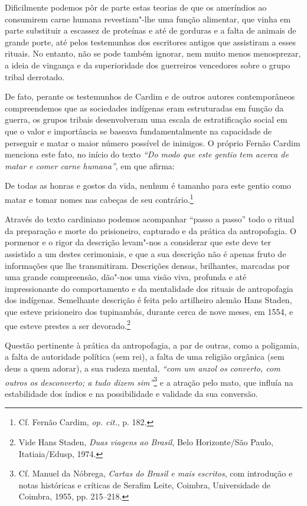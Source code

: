 Dificilmente podemos pôr de parte estas teorias de que os ameríndios
ao consumirem carne humana revestiam"-lhe uma função alimentar, que
vinha em parte substituir a escassez de proteínas e até de gorduras e a
falta de animais de grande porte, até pelos testemunhos dos escritores
antigos que assistiram a esses rituais. No entanto, não se pode também
ignorar, nem muito menos menosprezar, a ideia de vingança e da
superioridade dos guerreiros vencedores sobre o grupo tribal derrotado.

De fato, perante os testemunhos de Cardim e de outros autores
contemporâneos compreendemos que as sociedades indígenas eram
estruturadas em função da guerra, os grupos tribais desenvolveram uma
escala de estratificação social em que o valor e importância se baseava
fundamentalmente na capacidade de perseguir e matar o maior número
possível de inimigos. O próprio Fernão Cardim menciona este fato, no
início do texto \textit{``Do modo que este gentio tem
acerca de matar e comer carne humana''}, em que afirma:

\begin{hedraquote}
De todas as honras e gostos da vida, nenhum é tamanho para este gentio
como matar e tomar nomes nas cabeças de seu contrário.\footnote{ Cf. Fernão 
Cardim, \textit{op. cit.}, p. 182.} 
\end{hedraquote}

Através do texto cardiniano podemos acompanhar ``passo a passo'' todo
o ritual da preparação e morte do prisioneiro, capturado e da prática
da antropofagia. O pormenor e o rigor da descrição levam"-nos a
considerar que este deve ter assistido a um destes cerimoniais, e que a
sua descrição não é apenas fruto de informações que lhe transmitiram.
Descrições densas, brilhantes, marcadas por uma grande compreensão,
dão"-nos uma visão viva, profunda e até impressionante do comportamento
e da mentalidade dos rituais de antropofagia dos indígenas. Semelhante
descrição é feita pelo artilheiro alemão Hans Staden, que esteve
prisioneiro dos tupinambás, durante cerca de nove meses, em 1554, e que
esteve prestes a ser devorado.\footnote{ Vide Hans Staden,
\textit{Duas viagens ao Brasil}, Belo Horizonte/São Paulo, Itatiaia/Edusp, 1974.} 

Questão pertinente à prática da antropofagia, a par de outras, como a
poligamia, a falta de autoridade política (sem rei), a falta de uma
religião orgânica (sem deus a quem adorar), a sua rudeza mental,
\textit{``com um anzol os converto, com outros os desconverto; a tudo
dizem sim''}\footnote{ Cf. Manuel da Nóbrega, \textit{Cartas do
Brasil e mais escritos}, com introdução e notas históricas e críticas
de Serafim Leite, Coimbra, Universidade de Coimbra, 1955, pp. 215--218.}
e a atração pelo mato, que influía na estabilidade dos índios e na
possibilidade e validade da sua conversão. 

